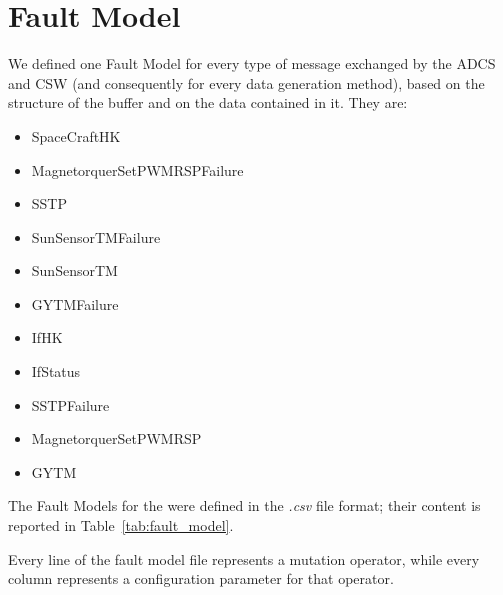 \section{Fault Model}
We defined one Fault Model for every type of message exchanged by the ADCS and CSW (and consequently for every data generation method), based on the structure of the buffer and on the data contained in it.
They are:
\begin{itemize}
\item SpaceCraftHK
\item MagnetorquerSetPWMRSPFailure
\item SSTP
\item SunSensorTMFailure
\item SunSensorTM
\item GYTMFailure
\item IfHK
\item IfStatus
\item SSTPFailure
\item MagnetorquerSetPWMRSP
\item GYTM
\end{itemize}

The Fault Models for the \case were defined in the \emph{.csv} file format; their content is reported in Table~\ref{tab:fault_model}.




Every line of the fault model file represents a mutation operator, while every column represents a configuration parameter for that operator.

